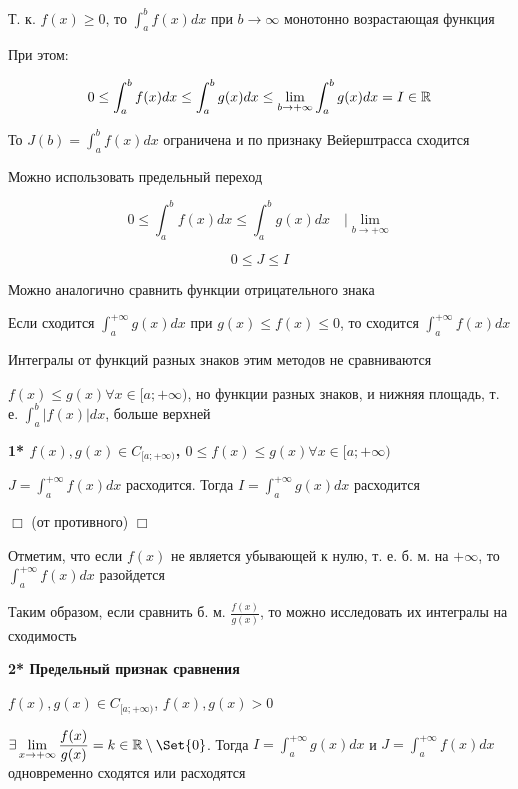 \documentclass[12pt]{article}
\begin{document}
    Т. к. $f(x) \geq 0$, то $\displaystyle \int^{b}_{a}f(x)dx$ при $b \to \infty$ монотонно возрастающая функция

    При этом:

    \[0 \leq \int^{b}_{a}f(x)dx \leq \int^{b}_{a}g(x)dx \leq \lim_{b \to +\infty} \int^{b}_{a}g(x)dx = I \in \mathbb{R}\]

    То $\displaystyle J(b) = \int^b_a f(x)dx$ ограничена и по признаку Вейерштрасса сходится

    Можно использовать предельный переход

    \[0 \leq \int^{b}_{a}f(x)dx \leq \int^{b}_{a}g(x)dx \quad \Big| \lim_{b \to +\infty}\]

    \[0 \leq J \leq I\]

    \Nota Можно аналогично сравнить функции отрицательного знака

    Если сходится $\displaystyle \int^{+\infty}_{a} g(x) dx$ при $g(x) \leq f(x) \leq 0$, то сходится $\displaystyle \int^{+\infty}_{a} f(x) dx$

    Интегралы от функций разных знаков этим методов не сравниваются

    $f(x) \leq g(x) \forall x \in [a;+\infty)$, но функции разных знаков, и нижняя площадь, т. е. $\displaystyle \int^{b}_{a} |f(x)| dx$, больше верхней

    \textbf{1* $f(x), g(x) \in C_{[a;+\infty)}$, $0 \leq f(x) \leq g(x) \forall x \in [a;+\infty)$}

    $\displaystyle J = \int^{+\infty}_{a} f(x) dx \text{  расходится. Тогда  } I = \int^{+\infty}_{a} g(x) dx \text{  расходится}$

    $\Box$ \Lab (от противного) $\Box$

    \Nota Отметим, что если $f(x)$ не является убывающей к нулю, т. е. б. м. на $+\infty$, то $\displaystyle \int^{+\infty}_{a} f(x) dx$ разойдется

    Таким образом, если сравнить б. м. $\displaystyle \frac{f(x)}{g(x)}$, то можно исследовать их интегралы на сходимость

    \hypertarget{improperintegralconvergenceinlimits}{}
    \textbf{2* Предельный признак сравнения}

    $f(x), g(x) \in C_{[a;+\infty)}$, $f(x), g(x) > 0$

    $\displaystyle \exists \lim_{x\to+\infty} \frac{f(x)}{g(x)} = k \in \Real \setminus \Set{0}$.
    Тогда $\displaystyle I = \int^{+\infty}_{a} g(x)dx$ и $\displaystyle J = \int^{+\infty}_{a} f(x)dx$ одновременно сходятся или расходятся
\end{document}
